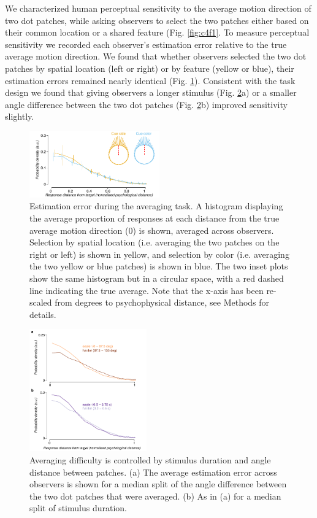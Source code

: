 We characterized human perceptual sensitivity to the average motion direction of two dot patches, while asking observers to select the two patches either based on their common location or a shared feature (Fig. \ref{fig:c4f1}. To measure perceptual sensitivity we recorded each observer's estimation error relative to the true average motion direction. We found that whether observers selected the two dot patches by spatial location (left or right) or by feature (yellow or blue), their estimation errors remained nearly identical (Fig. \ref{fig:c4f2}). Consistent with the task design we found that giving observers a longer stimulus (Fig. \ref{fig:c4f3}a) or a smaller angle difference between the two dot patches (Fig. \ref{fig:c4f3}b) improved sensitivity slightly. 

\begin{figure}
\centering
\includegraphics[keepaspectratio,width=0.5\textwidth]{figs_c4/f2_aca_perf.pdf}
\caption[Estimation error during averaging]{Estimation error during the averaging task. A histogram displaying the average proportion of responses at each distance from the true average motion direction (0) is shown, averaged across observers. Selection by spatial location (i.e. averaging the two patches on the right or left) is shown in yellow, and selection by color (i.e. averaging the two yellow or blue patches) is shown in blue. The two inset plots show the same histogram but in a circular space, with a red dashed line indicating the true average. Note that the x-axis has been re-scaled from degrees to psychophysical distance, see Methods for details.}
\label{fig:c4f2}
\end{figure}

\begin{figure}
\centering
\includegraphics[keepaspectratio,width=0.45\textwidth]{figs_c4/f2_aca_parameters.pdf}
\caption[Parameters that control difficulty of averaging]{Averaging difficulty is controlled by stimulus duration and angle distance between patches. (a) The average estimation error across observers is shown for a median split of the angle difference between the two dot patches that were averaged. (b) As in (a) for a median split of stimulus duration.}
\label{fig:c4f3}
\end{figure}

